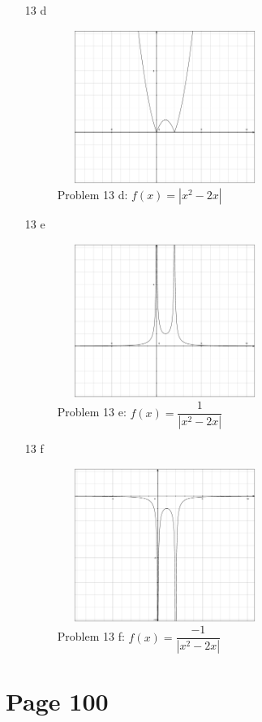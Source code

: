 \documentclass[fleqn,addpoints]{exam}
\begin{document}
\begin{itemize}
\item[13 d]
\begin{figure}[H]
  \centering
  \includegraphics[width=7cm,height=5cm]{p82-13d.eps}
  \caption*{Problem 13 d: $f(x) = |x^2 - 2x|$}
\end{figure}

\item[13 e]
\begin{figure}[H]
  \centering
  \includegraphics[width=7cm,height=5cm]{p82-13e.eps}
  \caption*{Problem 13 e: $f(x) = \dfrac{1}{|x^2 - 2x|}$}
\end{figure}

\item[13 f]
\begin{figure}[H]
  \centering
  \includegraphics[width=7cm,height=5cm]{p82-13f.eps}
  \caption*{Problem 13 f: $f(x) = \dfrac{-1}{|x^2 - 2x|}$}
\end{figure}


\end{itemize}

\section{Page 100}
\end{document}
